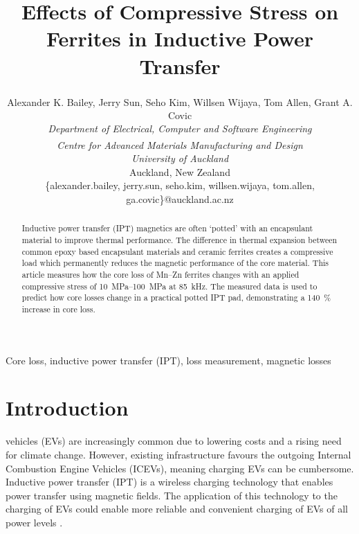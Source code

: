 \documentclass[conference]{IEEEtran}
\begin{document}
\title{Effects of Compressive Stress on Ferrites in Inductive Power Transfer}

\author{
  Alexander K. Bailey, Jerry Sun\textsuperscript{\textdagger}, Seho Kim, Willsen Wijaya\textsuperscript{\textdagger}, Tom Allen\textsuperscript{\textdagger}, Grant A. Covic\\
  \textit{Department of Electrical, Computer and Software Engineering}\\
  \textit{\textsuperscript{\textdagger}Centre for Advanced Materials Manufacturing and Design}\\
  \textit{University of Auckland}\\
  Auckland, New Zealand\\
  \{alexander.bailey, jerry.sun, seho.kim, willsen.wijaya, tom.allen, ga.covic\}@auckland.ac.nz\\ 
}
\maketitle

\begin{abstract}
  Inductive power transfer (IPT) magnetics are often `potted' with an encapsulant material to improve thermal performance.
  The difference in thermal expansion between common epoxy based encapsulant materials and ceramic ferrites creates a compressive load which permanently reduces the magnetic performance of the core material. 
  This article measures how the core loss of Mn--Zn ferrites changes with an applied compressive stress of \SIrange{10}{100}{\mega\pascal} at \SI{85}{\kilo\hertz}. 
  The measured data is used to predict how core losses change in a practical potted IPT pad, demonstrating a \SI{140}{\percent} increase in core loss. 
\end{abstract}

\begin{IEEEkeywords}
Core loss, inductive power transfer (IPT), loss measurement, magnetic losses
\end{IEEEkeywords}

\section{Introduction}

 vehicles (EVs) are increasingly common due to lowering costs and a rising need for climate change. 
However, existing infrastructure favours the outgoing Internal Combustion Engine Vehicles (ICEVs), meaning charging EVs can be cumbersome. 
Inductive power transfer (IPT) is a wireless charging technology that enables power transfer using magnetic fields. 
The application of this technology to the charging of EVs could enable more reliable and convenient charging of EVs of all power levels \cite{covicModernTrendsInductive2013b}. 
\end{document}
